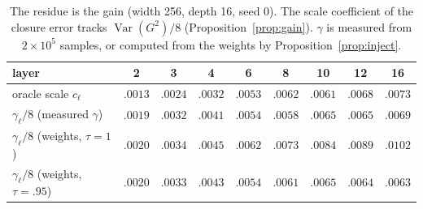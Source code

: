 \documentclass[11pt]{article}
\theoremstyle{definition}
\theoremstyle{remark}
\begin{document}
\begin{table}[h]\centering\small
\begin{tabular}{@{}lcccccccc@{}}
\toprule
layer & 2 & 3 & 4 & 6 & 8 & 10 & 12 & 16\\
\midrule
oracle scale $c_\ell$ & $.0013$ & $.0024$ & $.0032$ & $.0053$ & $.0062$ & $.0061$ & $.0068$ & $.0073$\\
$\gamma_\ell/8$ (measured $\gamma$) & $.0019$ & $.0032$ & $.0041$ & $.0054$ & $.0058$ & $.0065$ & $.0065$ & $.0069$\\
$\gamma_\ell/8$ (weights, $\tau=1$) & $.0020$ & $.0034$ & $.0045$ & $.0062$ & $.0073$ & $.0084$ & $.0089$ & $.0102$\\
$\gamma_\ell/8$ (weights, $\tau=.95$) & $.0020$ & $.0033$ & $.0043$ & $.0054$ & $.0061$ & $.0065$ & $.0064$ & $.0063$\\
\bottomrule
\end{tabular}
\caption{The residue is the gain (width 256, depth 16, seed 0). The scale coefficient of the closure error tracks $\operatorname{Var}(G^2)/8$ (Proposition~\ref{prop:gain}). $\gamma$ is measured from $2\times10^5$ samples, or computed from the weights by Proposition~\ref{prop:inject}.}\label{tab:gain}
\end{table}
\end{document}
